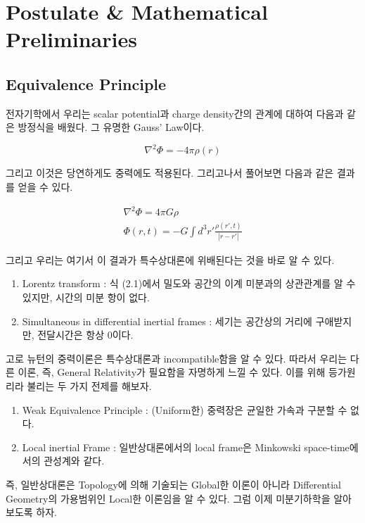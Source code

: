 \documentclass[paper=a4, fontsize=11pt]{scrartcl} %
\numberwithin{equation}{section} %
\numberwithin{figure}{section} %
\numberwithin{table}{section} %
\theoremstyle{plain}
\newcommand{\HS}{\hspace{0.5cm}}
\begin{document}
\section{Postulate \& Mathematical Preliminaries}
\subsection{Equivalence Principle}


\HS 전자기학에서 우리는 scalar potential과 charge density간의 관계에 대하여 다음과 같은 방정식을 배웠다. 그 유명한 Gauss' Law이다.

\begin{equation*}
 \nabla^2 \Phi = -4\pi\rho (r)
\end{equation*}

그리고 이것은 당연하게도 중력에도 적용된다. 그리고나서 풀어보면 다음과 같은 결과를 얻을 수 있다.


\begin{gather}
   \nabla^2 \Phi = 4\pi G \rho \\
   \Phi (r,t) = -G \int d^3 r' \frac{\rho (r',t)}{|r-r'|}
\end{gather}

그리고 우리는 여기서 이 결과가 특수상대론에 위배된다는 것을 바로 알 수 있다.

\begin{enumerate}
 \item Lorentz transform : 식 (2.1)에서 밀도와 공간의 이계 미분과의 상관관계를 알 수 있지만, 시간의 미분 항이 없다.
 \item Simultaneous in differential inertial frames : 세기는 공간상의 거리에 구애받지만, 전달시간은 항상 0이다.
\end{enumerate}

고로 뉴턴의 중력이론은 특수상대론과 incompatible함을 알 수 있다. 따라서 우리는 다른 이론, 즉, General Relativity가 필요함을 자명하게 느낄 수 있다.
이를 위해 등가원리라 불리는 두 가지 전제를 해보자.

\begin{enumerate}
 \item Weak Equivalence Principle : (Uniform한) 중력장은 균일한 가속과 구분할 수 없다.
 \item Local inertial Frame : 일반상대론에서의 local frame은 Minkowski space-time에서의 관성계와 같다.
\end{enumerate}

즉, 일반상대론은 Topology에 의해 기술되는 Global한 이론이 아니라 Differential Geometry의 가용범위인 Local한 이론임을 알 수 있다. \hspace{0.1cm} 그럼 이제 미분기하학을 
알아보도록 하자.
\end{document}
